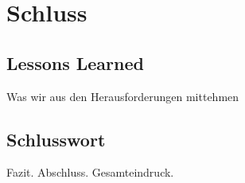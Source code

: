 \section {Schluss}

\subsection{Lessons Learned}

Was wir aus den Herausforderungen mittehmen

\subsection{Schlusswort}

Fazit. Abschluss. Gesamteindruck.
